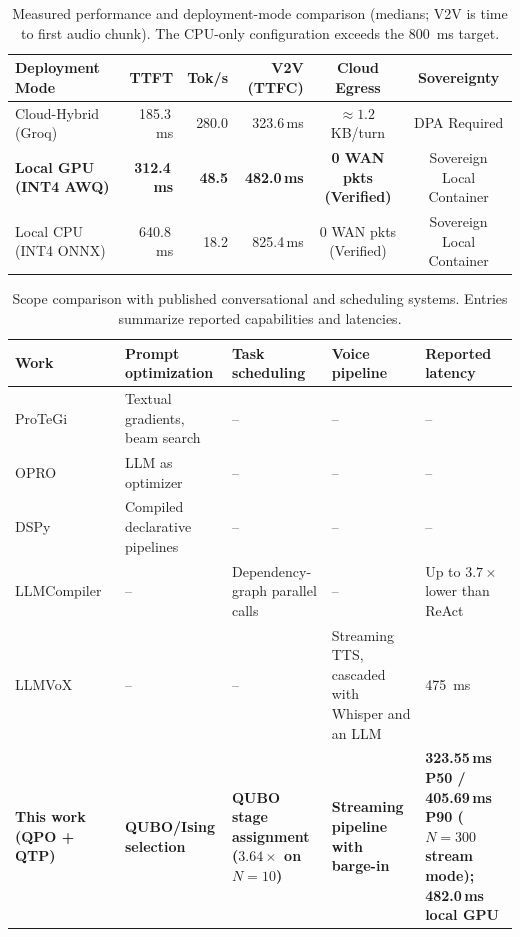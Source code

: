 \documentclass[review,12pt,times,authoryear]{elsarticle}
\theoremstyle{definition}
\begin{document}
\begin{table}[t]
\centering
\footnotesize
\setlength{\tabcolsep}{4pt}
\renewcommand{\arraystretch}{1.12}
\caption{Measured performance and deployment-mode comparison (medians; V2V is time to first audio chunk). The CPU-only configuration exceeds the \SI{800}{\milli\second} target.}
\label{tab:sovereign_comparison}
\begin{tabular*}{\textwidth}{@{\extracolsep{\fill}}lrrrcc@{}}
\toprule
\textbf{Deployment Mode} & \textbf{TTFT} & \textbf{Tok/s} & \textbf{V2V (TTFC)} & \textbf{Cloud Egress} & \textbf{Sovereignty} \\
\midrule
Cloud-Hybrid (Groq)     & 185.3\,ms & 280.0 & 323.6\,ms & $\approx 1.2$\,KB/turn & DPA Required \\
\textbf{Local GPU (INT4 AWQ)} & \textbf{312.4\,ms} & \textbf{48.5} & \textbf{482.0\,ms} & \textbf{0 WAN pkts (Verified)} & Sovereign Local Container \\
Local CPU (INT4 ONNX) & 640.8\,ms & 18.2 & 825.4\,ms & 0 WAN pkts (Verified) & Sovereign Local Container \\
\bottomrule
\end{tabular*}
\end{table}

\begin{table}[t]
\centering
\small
\setlength{\tabcolsep}{4pt}
\renewcommand{\arraystretch}{1.15}
\caption{Scope comparison with published conversational and scheduling systems. Entries summarize reported capabilities and latencies.}
\label{tab:sota}
\begin{tabular}{p{} p{} p{} p{} p{}}
\toprule
\textbf{Work} & \textbf{Prompt optimization} & \textbf{Task scheduling} & \textbf{Voice pipeline} & \textbf{Reported latency} \\
\midrule
ProTeGi~\citep{Pryzant2023} & Textual gradients, beam search & -- & -- & -- \\
OPRO~\citep{Yang2024} & LLM as optimizer & -- & -- & -- \\
DSPy~\citep{Khattab2024} & Compiled declarative pipelines & -- & -- & -- \\
LLMCompiler~\citep{Kim2024} & -- & Dependency-graph parallel calls & -- & Up to $3.7\times$ lower than ReAct \\
LLMVoX~\citep{Shikhar2025} & -- & -- & Streaming TTS, cascaded with Whisper and an LLM & \SI{475}{\milli\second} \\
\textbf{This work (QPO + QTP)} & \textbf{QUBO/Ising selection} & \textbf{QUBO stage assignment ($3.64\times$ on $N=10$)} & \textbf{Streaming pipeline with barge-in} & \textbf{323.55\,ms P50 / 405.69\,ms P90 ($N=300$ stream mode); 482.0\,ms local GPU} \\
\bottomrule
\end{tabular}
\end{table}
\end{document}
